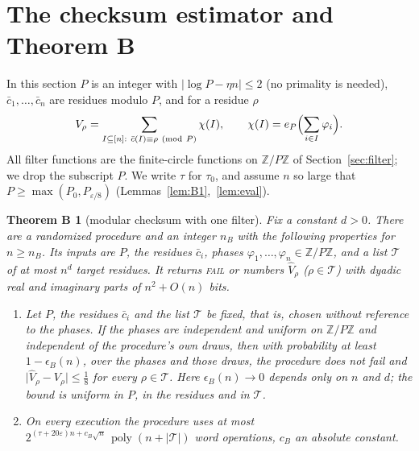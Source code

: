 \documentclass[11pt]{article}
\newtheorem*{thmB}{Theorem B}
\theoremstyle{definition}
\newcommand{\Z}{\mathbb Z}
\newcommand{\eps}{\varepsilon}
\newcommand{\bc}{\bar c}
\newcommand{\abs}[1]{\lvert #1\rvert}
\newcommand{\poly}{\operatorname{poly}}
\newcommand{\cT}{\mathcal T}
\begin{document}
\section{The checksum estimator and Theorem B}\label{sec:checksum}
In this section $P$ is an integer with $\abs{\log P-\eta n}\le2$ (no primality is needed), $\bc_1,\dots,\bc_n$ are
residues modulo $P$, and for a residue $\rho$
\begin{equation}\label{eq:V}
 V_\rho=\sum_{I\subseteq[n]:\ \bc(I)\equiv\rho\ (\mathrm{mod}\ P)}\chi(I),\qquad \chi(I)=e_P\Bigl(\sum_{i\in I}\varphi_i\Bigr).
\end{equation}
All filter functions are the finite-circle functions on $\Z/P\Z$ of Section~\ref{sec:filter}; we drop the subscript
$P$. We write $\tau$ for $\tau_0$, and assume $n$ so large that $P\ge\max(P_0,P_{\eps/8})$
(Lemmas~\ref{lem:B1},~\ref{lem:eval}).

\begin{thmB}[modular checksum with one filter]
Fix a constant $d>0$. There are a randomized procedure and an integer $n_B$ with the following properties for
$n\ge n_B$. Its inputs are $P$, the residues $\bc_i$, phases $\varphi_1,\dots,\varphi_n\in\Z/P\Z$, and a list $\cT$ of at
most $n^d$ target residues. It returns \textsc{fail} or numbers $\hat V_\rho$ ($\rho\in\cT$) with dyadic real and
imaginary parts of $n^2+O(n)$ bits.
\begin{enumerate}[label=\textup{(\arabic*)}]
\item Let $P$, the residues $\bc_i$ and the list $\cT$ be fixed, that is, chosen without reference to the phases. If
the phases are independent and uniform on $\Z/P\Z$ and independent of the procedure's own draws, then with
probability at least $1-\epsilon_B(n)$, over the phases and those draws, the procedure does not fail and
$\abs{\hat V_\rho-V_\rho}\le\tfrac18$ for every $\rho\in\cT$. Here $\epsilon_B(n)\to0$ depends only on $n$ and $d$; the
bound is uniform in $P$, in the residues and in $\cT$.
\item On every execution the procedure uses at most $2^{(\tau+20\eps)n+c_B\sqrt n}\,\poly(n+\abs\cT)$ word operations,
$c_B$ an absolute constant.
\end{enumerate}
\end{thmB}
\end{document}
